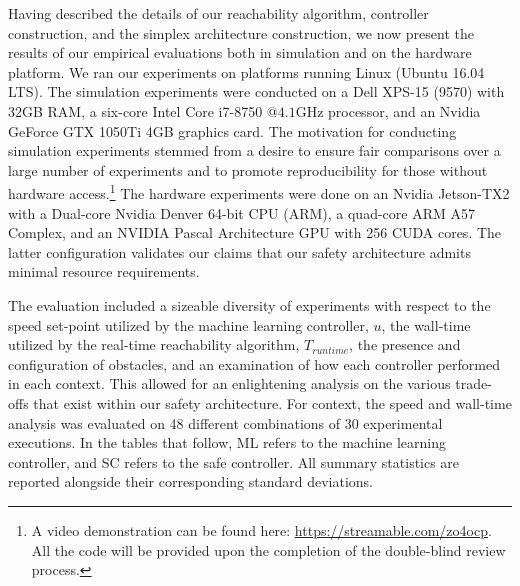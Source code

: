 \documentclass[manuscript,screen,review]{acmart}
\begin{document}



Having described the details of our reachability algorithm, controller construction, and the simplex architecture construction, we now present the results of our empirical evaluations both in simulation and on the hardware platform. We ran our experiments on platforms running Linux (Ubuntu 16.04 LTS). The simulation experiments were conducted on a Dell XPS-15 (9570) with 32GB RAM, a six-core Intel Core i7-8750 $@ 4.1\textrm{GHz}$ processor, and an Nvidia GeForce GTX 1050Ti 4GB graphics card. The motivation for conducting simulation experiments stemmed from a desire to ensure fair comparisons over a large number of experiments and to promote reproducibility for those without hardware access.\footnote{A video demonstration can be found here: \url{https://streamable.com/zo4ocp}. All the code will be provided upon the completion of the double-blind review process.} The hardware experiments were done on an Nvidia Jetson-TX2 with a Dual-core Nvidia Denver 64-bit CPU (ARM), a quad-core ARM A57 Complex, and an NVIDIA Pascal Architecture GPU with 256 CUDA cores. The latter configuration validates our claims that our safety architecture admits minimal resource requirements. 


The evaluation included a sizeable diversity of experiments with respect to the speed set-point utilized by the machine learning controller, $u$, the wall-time utilized by the real-time reachability algorithm, $T_{runtime}$, the presence and configuration of obstacles, and an examination of how each controller performed in each context. This allowed for an enlightening analysis on the various trade-offs that exist within our safety architecture. For context, the speed and wall-time analysis was evaluated on 48 different combinations of 30 experimental executions. %
In the tables that follow, ML refers to the machine learning controller, and SC refers to the safe controller. All summary statistics are reported alongside their corresponding standard deviations. %
\end{document}
